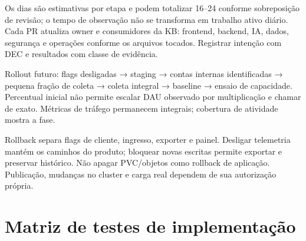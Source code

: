 \documentclass[10pt,a4paper]{article}
\begin{document}
Os dias são estimativas por etapa e podem totalizar 16--24 conforme
sobreposição de revisão; o tempo de observação não se transforma em
trabalho ativo diário. Cada PR atualiza owner e consumidores da KB:
frontend, backend, IA, dados, segurança e operações conforme os arquivos
tocados. Registrar intenção com DEC e resultados com classe de
evidência.

Rollout futuro: flags desligadas → staging → contas internas
identificadas → pequena fração de coleta → coleta integral → baseline →
ensaio de capacidade. Percentual inicial não permite escalar DAU
observado por multiplicação e chamar de exato. Métricas de tráfego
permanecem integrais; cobertura de atividade mostra a fase.

Rollback separa flags de cliente, ingresso, exporter e painel. Desligar
telemetria mantém os caminhos do produto; bloquear novas escritas
permite exportar e preservar histórico. Não apagar PVC/objetos como
rollback de aplicação. Publicação, mudanças no cluster e carga real
dependem de sua autorização própria.

\clearpage
\section{Matriz de testes de
implementação}\label{matriz-de-testes-de-implementauxe7uxe3o}
\end{document}
